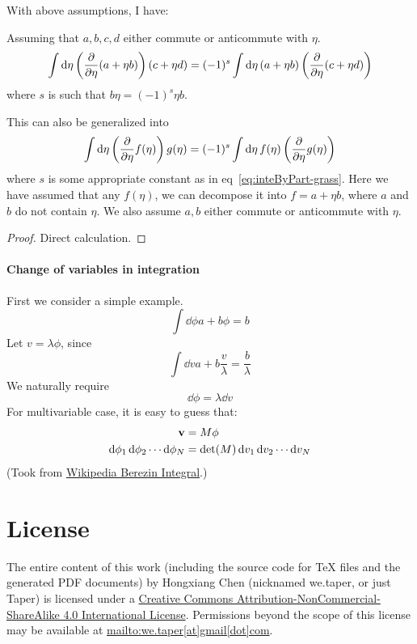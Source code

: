 \documentclass{article}
\begin{document}
With above assumptions, I have:
\begin{thm}
    Assuming that $a,b,c,d$ either commute or anticommute with $\eta$.
    \begin{equation}
        \int\dd{\eta} \left(\pdv{\eta}(a+\eta b) \right)(c+\eta d)
        = (-1)^s\int\dd{\eta} (a+\eta b) \left(\pdv{\eta}(c+\eta d)\right)
        \label{eq:inteByPart-grass}
    \end{equation}
    where $s$ is such that $b\eta = (-1)^s \eta b$.
\end{thm}
This can also be generalized into
\begin{equation}
    \int\dd{\eta} \left(\pdv{\eta}f(\eta) \right) g(\eta)
    = (-1)^s\int\dd{\eta} f(\eta) \left(\pdv{\eta}g(\eta)\right)
\end{equation}
where $s$ is some appropriate constant as in eq~\ref{eq:inteByPart-grass}. Here
we have assumed that any $f(\eta)$, we can decompose it into $f=a+\eta b$, where
$a$ and $b$ do not contain $\eta$. We also assume $a,b$ either commute or
anticommute with $\eta$.
\begin{proof}
    Direct calculation.
\end{proof}

\paragraph{Change of variables in integration}
First we consider a simple example.
\begin{equation}
    \int \dd{\phi} a+b\phi = b
\end{equation}
Let $v = \lambda \phi$, since
\begin{equation}
    \int\dd{v} a+ b\frac{v}{\lambda} = \frac{b}{\lambda}
\end{equation}
We naturally require
\begin{equation}
    \dd{\phi} = \lambda \dd{v}
\end{equation}
For multivariable case, it is easy to guess that:
\begin{align}
    \vb{v} &= M\vb{\phi} \\
    \dd{\phi_1}\dd{\phi_2}\cdots \dd{\phi_N} &= \det(M)\dd{v_1}\dd{v_2}\cdots\dd{v_N}
\end{align}
(Took from
\href{https://en.wikipedia.org/wiki/Berezin_integral#Change_of_Grassmann_variables}{Wikipedia
Berezin Integral}.)

\section{License}
The entire content of this work (including the source code
for TeX files and the generated PDF documents) by 
Hongxiang Chen (nicknamed we.taper, or just Taper) is
licensed under a 
\href{http://creativecommons.org/licenses/by-nc-sa/4.0/}{Creative 
Commons Attribution-NonCommercial-ShareAlike 4.0 International 
License}. Permissions beyond the scope of this 
license may be available at \url{mailto:we.taper[at]gmail[dot]com}.
\end{document}
